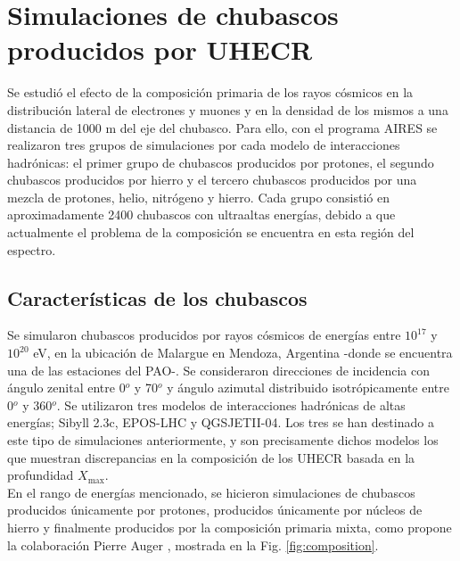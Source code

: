 \section{Simulaciones de chubascos producidos por UHECR}
Se estudió el efecto de la composición primaria de los rayos cósmicos en la distribución lateral de electrones y muones y en la densidad de los mismos a una distancia de 1000 m del eje del chubasco. Para ello, con el programa AIRES se realizaron tres grupos de simulaciones por cada modelo de interacciones hadrónicas: el primer grupo de chubascos producidos por protones, el segundo chubascos producidos por hierro y el tercero chubascos producidos por una mezcla de protones, helio, nitrógeno y hierro. Cada grupo consistió en aproximadamente 2400 chubascos con ultraaltas energías, debido a que actualmente el problema de la composición se encuentra en esta región del espectro. 

	\subsection{Características de los chubascos}
	 Se simularon chubascos producidos por rayos cósmicos de energías entre $10^{17}$ y $10^{20}$ eV, en la ubicación de Malargue en Mendoza, Argentina -donde se encuentra una de las estaciones del PAO-. Se consideraron direcciones de incidencia con ángulo zenital entre 0$^{o}$ y 70$^{o}$ y ángulo azimutal distribuido isotrópicamente entre 0$^{o}$ y 360$^{o}$. Se utilizaron tres modelos de interacciones hadrónicas de altas energías; Sibyll 2.3c, EPOS-LHC y QGSJETII-04. Los tres se han destinado a este tipo de simulaciones anteriormente, y son precisamente dichos modelos los que muestran discrepancias en la composición de los UHECR basada en la profundidad $X_{\text{max}}$. \\
	 
	 En el rango de energías mencionado, se hicieron simulaciones de chubascos producidos únicamente por protones, producidos únicamente por núcleos de hierro y finalmente producidos por la composición primaria mixta, como propone la colaboración Pierre Auger \cite{PAOcomposition}, mostrada en la Fig. \ref{fig:composition}.
	 
